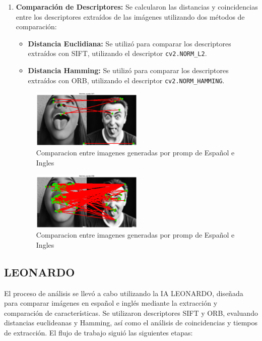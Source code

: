 \documentclass[unnumsec,webpdf,modern,large]{mam-authoring-template}
\theoremstyle{thmstyleone}%
\theoremstyle{thmstyletwo}%
\theoremstyle{thmstylethree}%
\begin{document}
\begin{enumerate}
    \item \textbf{Comparación de Descriptores:} Se calcularon las distancias y coincidencias entre los descriptores extraídos de las imágenes utilizando dos métodos de comparación:
    \begin{itemize}
        \item \textbf{Distancia Euclidiana:} Se utilizó para comparar los descriptores extraídos con SIFT, utilizando el descriptor \texttt{cv2.NORM\_L2}.
        \item \textbf{Distancia Hamming:} Se utilizó para comparar los descriptores extraídos con ORB, utilizando el descriptor \texttt{cv2.NORM\_HAMMING}.
    \end{itemize}
    \begin{figure}[h]
    \centering
    \includegraphics[width=0.5\textwidth]{dalle1.png}
    \caption{Comparacion entre imagenes generadas por promp de Español e Ingles}
    \label{fig:mesh1}
    \end{figure}

    \begin{figure}[h]
    \centering
    \includegraphics[width=0.5\textwidth]{dalle2.png}
    \caption{Comparacion entre imagenes generadas por promp de Español e Ingles}
    \label{fig:mesh1}
    \end{figure}
\end{enumerate}

\subsection{LEONARDO}  
El proceso de análisis se llevó a cabo utilizando la IA LEONARDO, diseñada para comparar imágenes en español e inglés mediante la extracción y comparación de características. Se utilizaron descriptores SIFT y ORB, evaluando distancias euclideanas y Hamming, así como el análisis de coincidencias y tiempos de extracción. El flujo de trabajo siguió las siguientes etapas:
\end{document}
